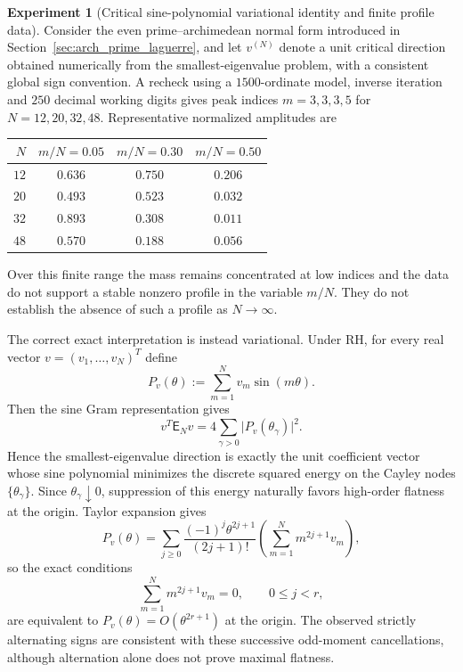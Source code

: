 \documentclass[11pt]{amsart}
\numberwithin{equation}{section}
\theoremstyle{plain}
\theoremstyle{definition}
\newtheorem{experiment}[theorem]{Experiment}
\theoremstyle{remark}
\newcommand{\RH}{\mathrm{RH}}
\newcommand{\E}{\mathsf E}
\begin{document}
\begin{experiment}[Critical sine-polynomial variational identity and finite profile data]
\label{exp:critical_vector_scaling}
Consider the even prime--archimedean normal form introduced in Section~\ref{sec:arch_prime_laguerre},
and let $v^{(N)}$ denote a unit critical direction obtained numerically from the
smallest-eigenvalue problem, with a consistent global sign convention.  A recheck using a
$1500$-ordinate model, inverse iteration and $250$ decimal working digits gives peak indices
$m=3,3,3,5$ for $N=12,20,32,48$.  Representative normalized amplitudes are
\begin{center}
\small
\begin{tabular}{rccc}
\toprule
$N$ & $m/N=0.05$ & $m/N=0.30$ & $m/N=0.50$\\
\midrule
$12$ & $0.636$ & $0.750$ & $0.206$\\
$20$ & $0.493$ & $0.523$ & $0.032$\\
$32$ & $0.893$ & $0.308$ & $0.011$\\
$48$ & $0.570$ & $0.188$ & $0.056$\\
\bottomrule
\end{tabular}
\end{center}
Over this finite range the mass remains concentrated at low indices and the data do not support a
stable nonzero profile in the variable $m/N$.  They do not establish the absence of such a profile
as $N\to\infty$.

The correct exact interpretation is instead variational.  Under $\RH$, for every real vector $v=(v_1,\ldots,v_N)^T$ define
\begin{equation}
 P_v(\theta):=\sum_{m=1}^N v_m\sin(m\theta).
 \label{eq:critical_sine_polynomial}
\end{equation}
Then the sine Gram representation gives
\begin{equation}
 \boxed{
 v^T\E_N v
 =4\sum_{\gamma>0}\bigl|P_v(\theta_\gamma)\bigr|^2.}
 \label{eq:critical_sine_energy}
\end{equation}
Hence the smallest-eigenvalue direction is exactly the unit coefficient vector whose sine polynomial minimizes the discrete squared energy on the Cayley nodes $\{\theta_\gamma\}$.  Since $\theta_\gamma\downarrow0$, suppression of this energy naturally favors high-order flatness at the origin.  Taylor expansion gives
\begin{equation}
 P_v(\theta)
 =\sum_{j\ge0}\frac{(-1)^j\theta^{2j+1}}{(2j+1)!}
 \left(\sum_{m=1}^N m^{2j+1}v_m\right),
 \label{eq:critical_sine_moment_expansion}
\end{equation}
so the exact conditions
\begin{equation}
 \sum_{m=1}^N m^{2j+1}v_m=0,
 \qquad 0\le j<r,
 \label{eq:critical_odd_moment_flatness}
\end{equation}
are equivalent to $P_v(\theta)=O(\theta^{2r+1})$ at the origin.  The observed strictly alternating signs are consistent with these successive odd-moment cancellations, although alternation alone does not prove maximal flatness.


\end{experiment}
\end{document}
